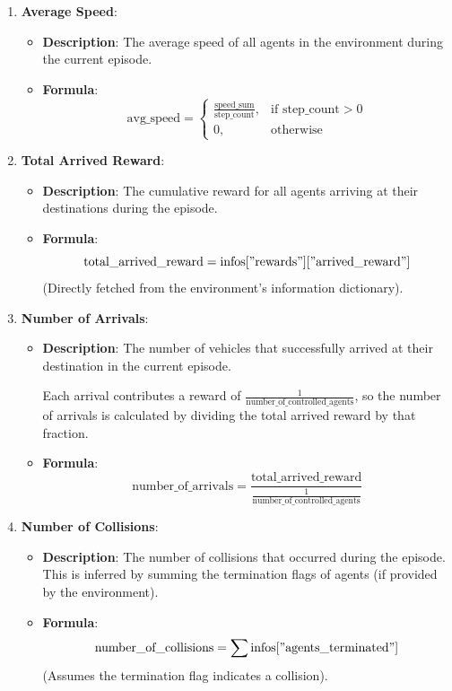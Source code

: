 \begin{enumerate}
    \item \textbf{Average Speed}:
    \begin{itemize}
        \item \textbf{Description}: The average speed of all agents in the environment during the current episode.
        \item \textbf{Formula}:
        \[
        \text{avg\_speed} =
        \begin{cases}
        \frac{\text{speed\_sum}}{\text{step\_count}}, & \text{if } \text{step\_count} > 0 \\
        0, & \text{otherwise}
        \end{cases}
        \]
    \end{itemize}
    
    \item \textbf{Total Arrived Reward}:
    \begin{itemize}
        \item \textbf{Description}: The cumulative reward for all agents arriving at their destinations during the episode.
        \item \textbf{Formula}:
        \[
        \text{total\_arrived\_reward} = \text{infos}["\text{rewards}"]["\text{arrived\_reward}"]
        \]
        (Directly fetched from the environment's information dictionary).
    \end{itemize}
    
    \item \textbf{Number of Arrivals}:
    \begin{itemize}
        \item \textbf{Description}: The number of vehicles that successfully arrived at their destination in the current episode. 
       
        Each arrival contributes a reward of \(\frac{1}{\text{number\_of\_controlled\_agents}}\), so the number of arrivals is calculated by dividing 
        the total arrived reward by that fraction.

        \item \textbf{Formula}:
        \[
        \text{number\_of\_arrivals} = \frac{\text{total\_arrived\_reward}}{\frac{1}{\text{number\_of\_controlled\_agents}}}
        \]
    \end{itemize}
    
    \item \textbf{Number of Collisions}:
    \begin{itemize}
        \item \textbf{Description}: The number of collisions that occurred during the episode. This is inferred by summing the termination flags of agents (if provided by the environment).
        \item \textbf{Formula}:
        \[
        \text{number\_of\_collisions} = \sum \text{infos}["\text{agents\_terminated}"]
        \]
        (Assumes the termination flag indicates a collision).
    \end{itemize}
\end{enumerate}

